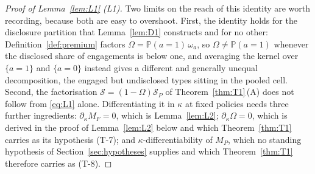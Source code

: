 \documentclass[11pt]{article}
\newcommand{\Prb}{\mathbb{P}}
\begin{document}
\begin{proof}[Proof of Lemma~\ref{lem:L1} (L1)]
Two limits on the reach of this identity are worth recording, because both are easy to overshoot.
First, the identity holds for the disclosure partition that Lemma~\ref{lem:D1} constructs and for no
other: Definition~\ref{def:premium} factors $\Omega = \Prb(a=1)\,\omega_a$, so
$\Omega \ne \Prb(a=1)$ whenever the disclosed share of engagements is below one, and averaging the
kernel over $\{a=1\}$ and $\{a=0\}$ instead gives a different and generally unequal decomposition,
the engaged but undisclosed types sitting in the pooled cell. Second, the factorisation
$\mathcal S = (1-\Omega)\mathcal S_P$ of Theorem~\ref{thm:T1}\,(A) does not follow from
\eqref{eq:L1} alone. Differentiating it in $\kappa$ at fixed policies needs three further
ingredients: $\partial_\kappa M_F = 0$, which is Lemma~\ref{lem:L2}; $\partial_\kappa\Omega = 0$,
which is derived in the proof of Lemma~\ref{lem:L2} below and which Theorem~\ref{thm:T1} carries as
its hypothesis (T-7); and $\kappa$-differentiability of $M_P$, which no standing hypothesis of
Section~\ref{sec:hypotheses} supplies and which Theorem~\ref{thm:T1} therefore carries as (T-8).
\end{proof}
\end{document}

